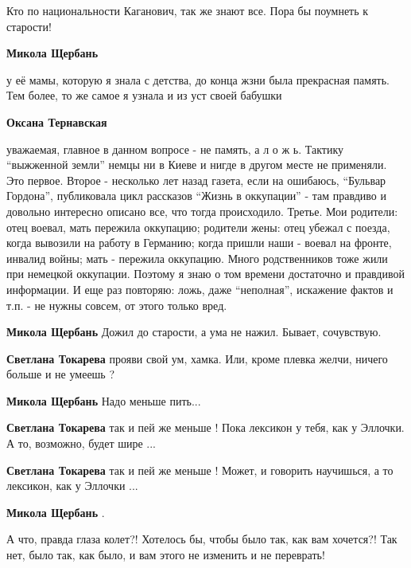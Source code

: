 \begin{itemize}
\begin{itemize}
\begin{itemize}
Кто по национальности Каганович, так же знают все. Пора бы поумнеть к старости!

\end{itemize} %

\textbf{Микола Щербань} 

у её мамы, которую я знала с детства, до конца жзни была прекрасная память. Тем
более, то же самое я узнала и из уст своей бабушки

\begin{itemize} %
\textbf{Оксана Тернавская} 

уважаемая, главное в данном вопросе - не память, а л о ж ь. Тактику
\enquote{выжженной земли} немцы ни в Киеве и нигде в другом месте не применяли. Это
первое. Второе - несколько лет назад газета, если на ошибаюсь, \enquote{Бульвар
Гордона}, публиковала цикл рассказов \enquote{Жизнь в оккупации} - там правдиво и
довольно интересно описано все, что тогда происходило. Третье. Мои родители:
отец воевал, мать пережила оккупацию; родители жены: отец убежал с поезда,
когда вывозили на работу в Германию; когда пришли наши - воевал на фронте,
инвалид войны; мать - пережила оккупацию. Много родственников тоже жили при
немецкой оккупации. Поэтому я знаю о том времени достаточно и правдивой
информации. И еще раз повторяю: ложь, даже \enquote{неполная}, искажение фактов и
т.п. - не нужны совсем, от этого только вред.

\end{itemize} %

\textbf{Микола Щербань} Дожил до старости, а ума не нажил. Бывает, сочувствую.

\begin{itemize} %
\textbf{Светлана Токарева} прояви свой ум, хамка.
Или, кроме плевка желчи, ничего больше и не умеешь ?

\textbf{Микола Щербань} Надо меньше пить...

\textbf{Светлана Токарева} так и пей же меньше ! Пока лексикон у тебя, как у Эллочки. А то, возможно, будет шире ...

\textbf{Светлана Токарева} так и пей же меньше ! Может, и говорить научишься, а то лексикон, как у Эллочки ...
\end{itemize} %

\textbf{Микола Щербань} . 

А что, правда глаза колет?! Хотелось бы, чтобы было так, как вам хочется?! Так
нет, было так, как было, и вам этого не изменить и не переврать!


\end{itemize}
\end{itemize}
